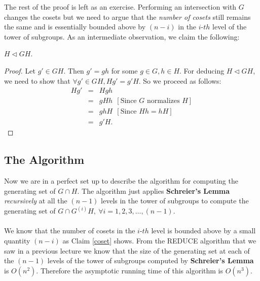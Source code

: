 The rest of the proof is left as an exercise. Performing an intersection with $G$ changes the cosets but we need to argue that the \emph{number of cosets} still remains the same and is essentially bounded above by $(n-i)$ in the $i$-$th$ level of the tower of subgroups. As an intermediate observation, we claim the following:
\begin{claim}
	$H\triangleleft GH$.
\end{claim}
\begin{proof}
	Let $g'\in GH$. Then $g' = gh$ for some $g\in G, h\in H$. For deducing $H\triangleleft GH$, we need to show that $\forall g'\in GH, Hg' = g'H$. So we proceed as follows:
	\begin{eqnarray*}
		Hg' &=& Hgh\\
			&=& gHh~~[\text{Since }G\text{ normalizes }H]\\
			&=& ghH~~[\text{Since }Hh = hH]\\
			&=& g'H.
	\end{eqnarray*}
\end{proof}
\subsection{The Algorithm}
Now we are in a perfect set up to describe the algorithm for computing the generating set of $G\cap H$. The algorithm just applies {\bf Schreier's Lemma} \emph{recursively} at all the $(n-1)$ levels in the tower of subgroups to compute the generating set of $G\cap G^{(i)}H,~\forall i=1,2,3,\ldots,(n-1)$.\\\\We know that the number of cosets in the $i$-$th$ level is bounded above by a small quantity $(n-i)$ as Claim \ref{coset} shows. From the REDUCE algorithm that we saw in a previous lecture we know that the size of the generating set at each of the $(n-1)$ levels of the tower of subgroups computed by {\bf Schreier's Lemma} is $O(n^2)$. Therefore the asymptotic running time of this algorithm is $O(n^3)$.

